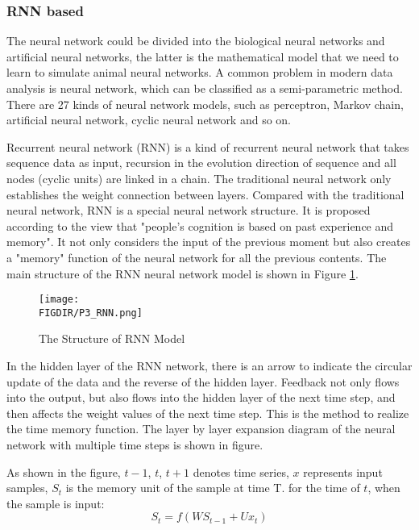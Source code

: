 \subsubsection{RNN based}
The neural network could be divided into the biological neural networks and artificial neural networks, the latter is the mathematical model that we need to learn to simulate animal neural networks. A common problem in modern data analysis is neural network, which can be classified as a semi-parametric method. There are 27 kinds of neural network models, such as perceptron, Markov chain, artificial neural network, cyclic neural network and so on. 

Recurrent neural network (RNN) \cite{tarwani2017survey} is a kind of recurrent neural network that takes sequence data as input, recursion in the evolution direction of sequence and all nodes (cyclic units) are linked in a chain. The traditional neural network only establishes the weight connection between layers. Compared with the traditional neural network, RNN is a special neural network structure. It is proposed according to the view that "people's cognition is based on past experience and memory". It not only considers the input of the previous moment but also creates a "memory" function of the neural network for all the previous contents. The main structure of the RNN neural network model is shown in Figure \ref{RNN structure}.

\begin{figure}[ht]
\centering
\texttt{[image: \\FIGDIR/P3\_RNN.png]}
\caption{The Structure of RNN Model}
\label{RNN structure}
\end{figure}
In the hidden layer of the RNN network, there is an arrow to indicate the circular update of the data and the reverse of the hidden layer. Feedback not only flows into the output, but also flows into the hidden layer of the next time step, and then affects the weight values of the next time step. This is the method to realize the time memory function. The layer by layer expansion diagram of the neural network with multiple time steps is shown in figure.

As shown in the figure, $t-1 $, $t $, $t + 1 $ denotes time series, $x $ represents input samples, $S_ {t} $ is the memory unit of the sample at time T. for the time of $t$, when the sample is input:\\
\begin{equation}
 S_ {t} = f (W S_ {t-1}+ U x_ {t} ) 
\end{equation}

